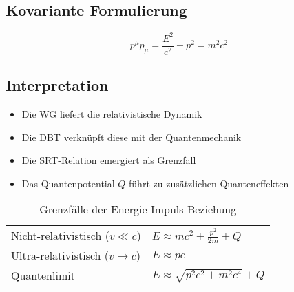\subsection{Kovariante Formulierung}
\begin{equation}
p^\mu p_\mu = \frac{E^2}{c^2} - p^2 = m^2c^2
\end{equation}

\subsection{Interpretation}
\begin{itemize}
\item Die WG liefert die relativistische Dynamik
\item Die DBT verknüpft diese mit der Quantenmechanik
\item Die SRT-Relation emergiert als Grenzfall
\item Das Quantenpotential $Q$ führt zu zusätzlichen Quanteneffekten
\end{itemize}

\begin{table}[h]
\centering
\caption{Grenzfälle der Energie-Impuls-Beziehung}
\begin{tabular}{ll}
\hline
Nicht-relativistisch ($v \ll c$) & $E \approx mc^2 + \frac{p^2}{2m} + Q$ \\
Ultra-relativistisch ($v \to c$) & $E \approx pc$ \\
Quantenlimit & $E \approx \sqrt{p^2c^2 + m^2c^4} + Q$ \\
\hline
\end{tabular}
\end{table}
